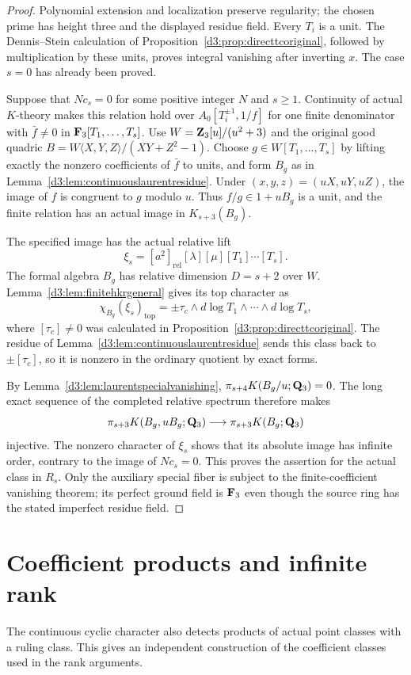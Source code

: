 \begin{proof}
Polynomial extension and localization preserve regularity; the
chosen prime has height three and the displayed residue field.
Every $T_i$ is a unit. The Dennis--Stein calculation of
Proposition~\ref{d3:prop:directtcoriginal}, followed by multiplication
by these units, proves integral vanishing after inverting $x$.
The case $s=0$ has already been proved.

Suppose that $N c_s=0$ for some positive integer $N$ and $s\geq1$.
Continuity of actual $K$-theory makes this relation hold over
$A_0[T_i^{\pm1},1/f]$ for one finite denominator with
$\bar f\ne0$ in $\mathbf F_3[T_1,\ldots,T_s]$.
Use $W=\mathbf Z_3[u]/(u^2+3)$ and the original good quadric
$B=W\langle X,Y,Z\rangle/(XY+Z^2-1)$.
Choose $g\in W[T_1,\ldots,T_s]$ by lifting exactly the nonzero
coefficients of $\bar f$ to units, and form $B_g$ as in
Lemma~\ref{d3:lem:continuouslaurentresidue}.
Under $(x,y,z)=(uX,uY,uZ)$, the image of $f$ is congruent to $g$
modulo $u$. Thus $f/g\in1+uB_g$ is a unit, and the finite
relation has an actual image in $K_{s+3}(B_g)$.

The specified image has the actual relative lift
\[
 \xi_s=[a^2]_{\mathrm{rel}}[\lambda][\mu]
                                  [T_1]\cdots[T_s].
\]
The formal algebra $B_g$ has relative dimension $D=s+2$ over $W$.
Lemma~\ref{d3:lem:finitehkrgeneral} gives its top character as
\[
 \chi_{B_g}(\xi_s)_{\mathrm{top}}
       =\pm\tau_c\wedge d\log T_1\wedge\cdots\wedge d\log T_s,
\]
where $[\tau_c]\ne0$ was calculated in
Proposition~\ref{d3:prop:directtcoriginal}.
The residue of Lemma~\ref{d3:lem:continuouslaurentresidue} sends this
class back to $\pm[\tau_c]$, so it is nonzero in the ordinary
quotient by exact forms.

By Lemma~\ref{d3:lem:laurentspecialvanishing},
$\pi_{s+4}K(B_g/u;\mathbf Q_3)=0$. The long exact sequence of the
completed relative spectrum therefore makes
\[
 \pi_{s+3}K(B_g,uB_g;\mathbf Q_3)
       \longrightarrow\pi_{s+3}K(B_g;\mathbf Q_3)
\]
injective. The nonzero character of $\xi_s$ shows that its absolute
image has infinite order, contrary to the image of $Nc_s=0$.
This proves the assertion for the actual class in $R_s$.
Only the auxiliary special fiber is subject to the finite-coefficient
vanishing theorem; its perfect ground field is $\mathbf F_3$ even though
the source ring has the stated imperfect residue field.
\end{proof}


\section{Coefficient products and infinite rank}
The continuous cyclic character also detects products of actual point
classes with a ruling class. This gives an independent construction
of the coefficient classes used in the rank arguments.

